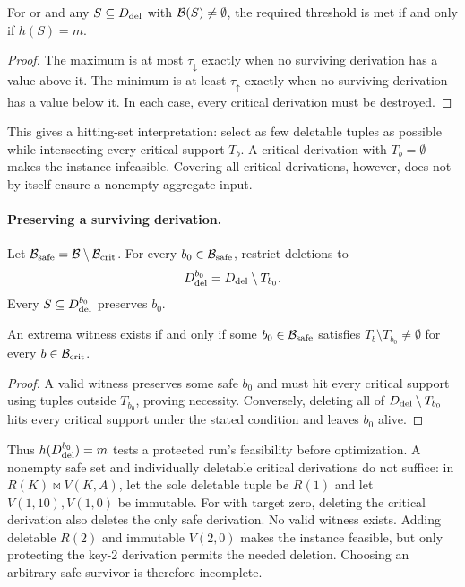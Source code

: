 \begin{lemma}
\label{lem:extrema-equivalence}
For  or  and any $S\subseteq D_{\mathrm{del}}$ with
$\mathcal{B}(S)\ne\emptyset$, the required threshold is met if and only if
$h(S)=m$.
\end{lemma}
\begin{proof}
The maximum is at most $\tau_{\downarrow}$ exactly when no surviving
derivation has a value above it. The minimum is at least
$\tau_{\uparrow}$ exactly when no surviving derivation has a value
below it. In each case, every critical derivation must be destroyed.
\end{proof}

This gives a hitting-set interpretation: select as few deletable tuples
as possible while intersecting every critical support $T_b$. A critical
derivation with $T_b=\emptyset$ makes the instance infeasible.
Covering all critical derivations, however, does not by itself ensure
a nonempty aggregate input.

\paragraph{Preserving a surviving derivation.}
Let $\mathcal{B}_{\mathrm{safe}}=\mathcal{B}\setminus\mathcal{B}_{\mathrm{crit}}$.
For every $b_0\in\mathcal{B}_{\mathrm{safe}}$, restrict deletions to
\begin{equation}
\label{eq:protected-derivation}
D_{\mathrm{del}}^{b_0}=D_{\mathrm{del}}\setminus T_{b_0}.
\end{equation}
Every $S\subseteq D_{\mathrm{del}}^{b_0}$ preserves $b_0$.

\begin{lemma}
\label{lem:extrema-feasibility}
An extrema witness exists if and only if some $b_0\in\mathcal{B}_{\mathrm{safe}}$
satisfies $T_b\setminus T_{b_0}\ne\emptyset$ for every
$b\in\mathcal{B}_{\mathrm{crit}}$.
\end{lemma}
\begin{proof}
A valid witness preserves some safe $b_0$ and must hit every critical
support using tuples outside $T_{b_0}$, proving necessity. Conversely,
deleting all of $D_{\mathrm{del}}\setminus T_{b_0}$ hits every critical support under
the stated condition and leaves $b_0$ alive.
\end{proof}
Thus $h(D_{\mathrm{del}}^{b_0})=m$ tests a protected run's feasibility before
optimization. A nonempty safe set and individually deletable critical
derivations do not suffice: in $R(K)\Join V(K,A)$, let the sole deletable
tuple be $R(1)$ and let $V(1,10),V(1,0)$ be immutable. For 
with target zero, deleting the critical derivation also deletes the only
safe derivation. No valid witness exists. Adding deletable $R(2)$ and
immutable $V(2,0)$ makes the instance feasible, but only protecting the
key-2 derivation permits the needed deletion. Choosing an arbitrary safe
survivor is therefore incomplete.

